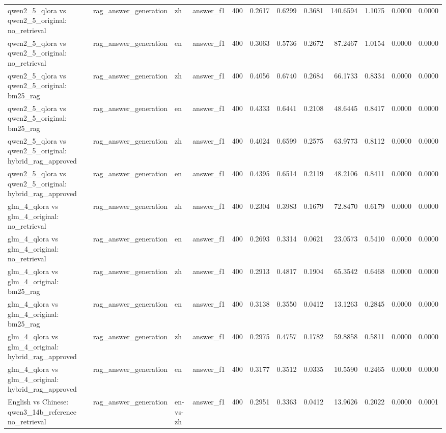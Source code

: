 \begin{tabular}{llllrrrrrrrr}
qwen2_5_qlora vs qwen2_5_original: no_retrieval & rag_answer_generation & zh & answer_f1 & 400 & 0.2617 & 0.6299 & 0.3681 & 140.6594 & 1.1075 & 0.0000 & 0.0000 \\
qwen2_5_qlora vs qwen2_5_original: no_retrieval & rag_answer_generation & en & answer_f1 & 400 & 0.3063 & 0.5736 & 0.2672 & 87.2467 & 1.0154 & 0.0000 & 0.0000 \\
qwen2_5_qlora vs qwen2_5_original: bm25_rag & rag_answer_generation & zh & answer_f1 & 400 & 0.4056 & 0.6740 & 0.2684 & 66.1733 & 0.8334 & 0.0000 & 0.0000 \\
qwen2_5_qlora vs qwen2_5_original: bm25_rag & rag_answer_generation & en & answer_f1 & 400 & 0.4333 & 0.6441 & 0.2108 & 48.6445 & 0.8417 & 0.0000 & 0.0000 \\
qwen2_5_qlora vs qwen2_5_original: hybrid_rag_approved & rag_answer_generation & zh & answer_f1 & 400 & 0.4024 & 0.6599 & 0.2575 & 63.9773 & 0.8112 & 0.0000 & 0.0000 \\
qwen2_5_qlora vs qwen2_5_original: hybrid_rag_approved & rag_answer_generation & en & answer_f1 & 400 & 0.4395 & 0.6514 & 0.2119 & 48.2106 & 0.8411 & 0.0000 & 0.0000 \\
glm_4_qlora vs glm_4_original: no_retrieval & rag_answer_generation & zh & answer_f1 & 400 & 0.2304 & 0.3983 & 0.1679 & 72.8470 & 0.6179 & 0.0000 & 0.0000 \\
glm_4_qlora vs glm_4_original: no_retrieval & rag_answer_generation & en & answer_f1 & 400 & 0.2693 & 0.3314 & 0.0621 & 23.0573 & 0.5410 & 0.0000 & 0.0000 \\
glm_4_qlora vs glm_4_original: bm25_rag & rag_answer_generation & zh & answer_f1 & 400 & 0.2913 & 0.4817 & 0.1904 & 65.3542 & 0.6468 & 0.0000 & 0.0000 \\
glm_4_qlora vs glm_4_original: bm25_rag & rag_answer_generation & en & answer_f1 & 400 & 0.3138 & 0.3550 & 0.0412 & 13.1263 & 0.2845 & 0.0000 & 0.0000 \\
glm_4_qlora vs glm_4_original: hybrid_rag_approved & rag_answer_generation & zh & answer_f1 & 400 & 0.2975 & 0.4757 & 0.1782 & 59.8858 & 0.5811 & 0.0000 & 0.0000 \\
glm_4_qlora vs glm_4_original: hybrid_rag_approved & rag_answer_generation & en & answer_f1 & 400 & 0.3177 & 0.3512 & 0.0335 & 10.5590 & 0.2465 & 0.0000 & 0.0000 \\
English vs Chinese: qwen3_14b_reference no_retrieval & rag_answer_generation & en-vs-zh & answer_f1 & 400 & 0.2951 & 0.3363 & 0.0412 & 13.9626 & 0.2022 & 0.0000 & 0.0001 \\

\end{tabular}
